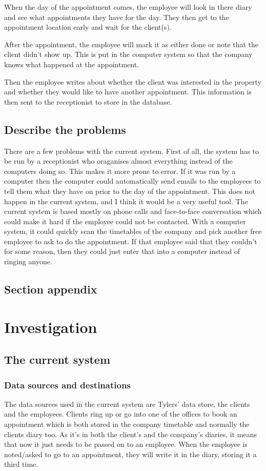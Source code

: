 When the day of the appointment comes, the employee will look in there diary and see what appointments they have for the day. They then get to the appointment location early and wait for the client(s).

After the appointment, the employee will mark it as either done or note that the client didn't show up. This is put in the computer system so that the company knows what happened at the appointment. 

Then the employee writes about whether the client was interested in the property and whether they would like to have another appointment. This information is then sent to the receptionist to store in the database.
\subsection{Describe the problems}
There are a few problems with the current system. First of all, the system has to be run by a receptionist who oraganises almost everything instead of the computers doing so. This makes it more prone to error. If it was run by a computer then the computer could automatically send emails to the employees to tell them what they have on prior to the day of the appointment. This does not happen in the current system, and I think it would be a very useful tool. The current system is based mostly on phone calls and face-to-face conversation which could make it hard if the employee could not be contacted. With a computer system, it could quickly scan the timetables of the company and pick another free employee to ask to do the appointment. If that employee said that they couldn't for some reason, then they could just enter that into a computer instead of ringing anyone. 
\subsection{Section appendix}

\section{Investigation}
\subsection{The current system}
\subsubsection{Data sources and destinations}
The data sources used in the current system are Tylers' data store, the clients and the employees. Clients ring up or go into one of the offices to book an appointment which is both stored in the company timetable and normally the clients diary too. As it's in both the client's and the company's diaries, it means that now it just needs to be passed on to an employee. When the employee is noted/asked to go to an appointment, they will write it in the diary, storing it a third time.
